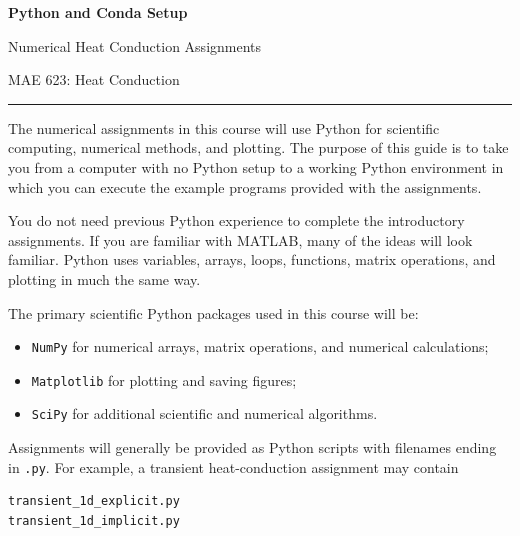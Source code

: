 \documentclass[11pt]{article}
\begin{document}

\begin{center}

    {\LARGE\bfseries\color{wvuBlue}
    Python and Conda Setup}

    \vspace{3pt}

    {\large Numerical Heat Conduction Assignments}

    \vspace{2pt}

    {\normalsize MAE 623: Heat Conduction}

    \vspace{7pt}

    \rule{\textwidth}{0.7pt}

\end{center}

\vspace{4pt}

The numerical assignments in this course will use Python for scientific
computing, numerical methods, and plotting. The purpose of this guide is
to take you from a computer with no Python setup to a working Python
environment in which you can execute the example programs provided with
the assignments.

You do not need previous Python experience to complete the introductory
assignments. If you are familiar with MATLAB, many of the ideas will look
familiar. Python uses variables, arrays, loops, functions, matrix
operations, and plotting in much the same way.

The primary scientific Python packages used in this course will be:

\begin{itemize}
    \item \texttt{NumPy} for numerical arrays, matrix operations, and
          numerical calculations;
    \item \texttt{Matplotlib} for plotting and saving figures;
    \item \texttt{SciPy} for additional scientific and numerical
          algorithms.
\end{itemize}

Assignments will generally be provided as Python scripts with filenames
ending in \texttt{.py}. For example, a transient heat-conduction
assignment may contain

\begin{lstlisting}
transient_1d_explicit.py
transient_1d_implicit.py
\end{lstlisting}
\end{document}

